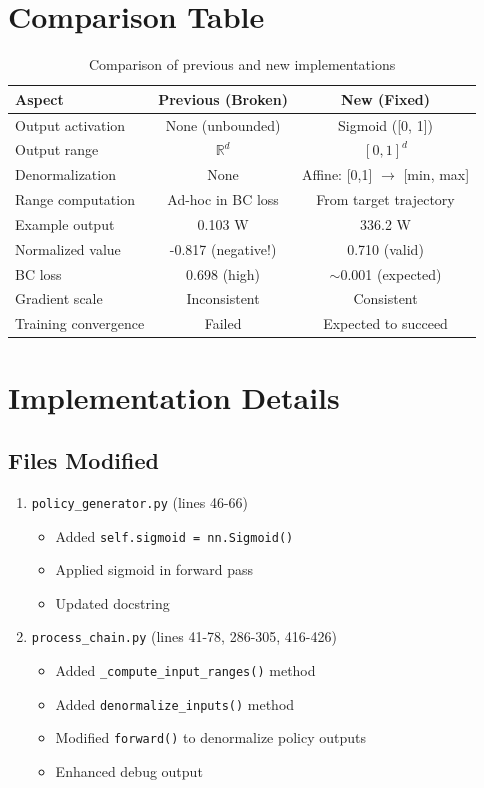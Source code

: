 \documentclass[11pt,a4paper]{article}
\begin{document}
\section{Comparison Table}

\begin{table}[h]
\centering
\begin{tabular}{@{}lcc@{}}
\toprule
\textbf{Aspect} & \textbf{Previous (Broken)} & \textbf{New (Fixed)} \\ \midrule
Output activation & None (unbounded) & Sigmoid ([0, 1]) \\
Output range & $\mathbb{R}^d$ & $[0, 1]^d$ \\
Denormalization & None & Affine: [0,1] $\to$ [min, max] \\
Range computation & Ad-hoc in BC loss & From target trajectory \\
Example output & 0.103 W & 336.2 W \\
Normalized value & -0.817 (negative!) & 0.710 (valid) \\
BC loss & 0.698 (high) & $\sim$0.001 (expected) \\
Gradient scale & Inconsistent & Consistent \\
Training convergence & Failed & Expected to succeed \\ \bottomrule
\end{tabular}
\caption{Comparison of previous and new implementations}
\end{table}

\section{Implementation Details}

\subsection{Files Modified}

\begin{enumerate}
    \item \texttt{policy\_generator.py} (lines 46-66)
    \begin{itemize}
        \item Added \texttt{self.sigmoid = nn.Sigmoid()}
        \item Applied sigmoid in forward pass
        \item Updated docstring
    \end{itemize}

    \item \texttt{process\_chain.py} (lines 41-78, 286-305, 416-426)
    \begin{itemize}
        \item Added \texttt{\_compute\_input\_ranges()} method
        \item Added \texttt{denormalize\_inputs()} method
        \item Modified \texttt{forward()} to denormalize policy outputs
        \item Enhanced debug output
    \end{itemize}
\end{enumerate}
\end{document}
